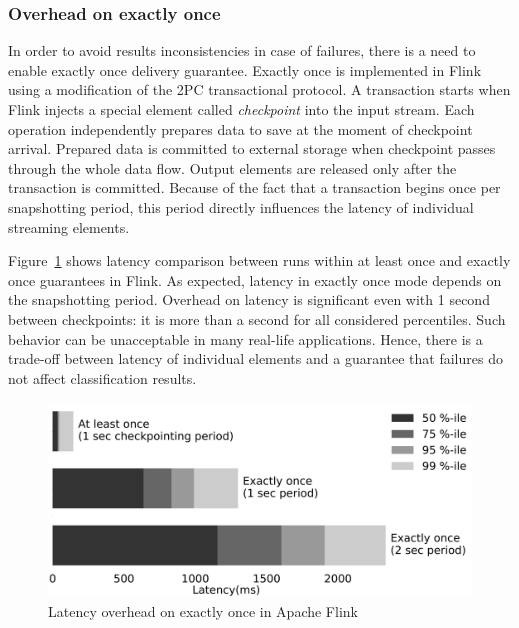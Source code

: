 \subsubsection{Overhead on exactly once}

In order to avoid results inconsistencies in case of failures, there is a need to enable exactly once delivery guarantee. 
Exactly once is implemented in Flink using a modification of the 2PC transactional protocol. A transaction starts when Flink injects a special element called {\em checkpoint} into the input stream. Each operation independently prepares data to save at the moment of checkpoint arrival. Prepared data is committed to external storage when checkpoint passes through the whole data flow. Output elements are released only after the transaction is committed. Because of the fact that a transaction begins once per snapshotting period, this period directly influences the latency of individual streaming elements.

Figure~\ref{fault_tolerance} shows latency comparison between runs within at least once and exactly once guarantees in Flink. As expected, latency in exactly once mode depends on the snapshotting period. Overhead on latency is significant even with 1 second between checkpoints: it is more than a second for all considered percentiles. Such behavior can be unacceptable in many real-life applications. Hence, there is a trade-off between latency of individual elements and a guarantee that failures do not affect classification results.

\begin{figure}[htbp]
  \centering
  \includegraphics[scale=0.09]{pics/fault_tolerance}
  \caption{Latency overhead on exactly once in Apache Flink}
  \label {fault_tolerance}
\end{figure}

